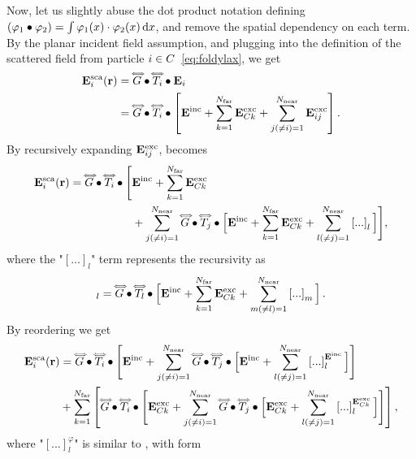 Now, let us slightly abuse the dot product notation defining $(\varphi_1 \bigcdot{x} \varphi_2) = \int \varphi_1(x)\cdot\varphi_2(x) \diff x$, and remove the spatial dependency on each term. By the planar incident field assumption, and plugging  into the definition of the scattered field from particle $i\in\Cls$~\eqref{eq:foldylax}, we get
%
\begin{align}
\label{eq:scafield_cluster1}
\ScaEField_i(\px) & = \sGreen \bigcdot{\px} \dyad{T}_i \bigcdot{\px'} \EField_i \\ & = \sGreen \bigcdot{\px'} \dyad{T}_i \bigcdot{\px''}  \left[\IncEField + \sum_{k=1}^\Nfar \ExcEField_{\Cls k}+ \sum_{j(\neq i)=1}^\Nnear \ExcEField_{ij} \right] \nonumber.
\end{align}
% 
By recursively expanding $\ExcEField_{ij}$,  becomes
\begin{align}
\label{eq:scafieldcluster3}
\ScaEField_i(\px) = \sGreen \bigcdot{\px'} \dyad{T}_i \bigcdot{\px''} \Bigg[ &\IncEField + \sum_{k=1}^\Nfar \ExcEField_{\Cls k}  \\ 
&  + \sum_{j(\neq i)=1}^\Nnear \sGreen \bigcdot{\px'''} \dyad{T}_j \bigcdot{{\px^{iv}}} \Big[\IncEField + \sum_{k=1}^\Nfar \ExcEField_{\Cls k} + \sum_{l(\neq j)=1}^\Nnear \left[...\right]_l \Big] \Bigg] \nonumber,
\end{align}
%
where the "$[...]_l$" term represents the recursivity as 
\begin{equation}
[...]_l= \sGreen \bigcdot{\px'} \dyad{T}_l \bigcdot{\px''} \Big[\IncEField + \sum_{k=1}^\Nfar \ExcEField_{\Cls k} + \sum_{m(\neq l)=1}^\Nnear \left[...\right]_m\Big] \,.
\label{eq:recursivity1}
\end{equation}
%
By reordering  we get
%
\begin{align}
\label{eq:scafieldcluster4}
\ScaEField_i(\px) &= \sGreen \bigcdot{\px'} \dyad{T}_i \bigcdot{\px''} \Bigg[ \IncEField + \sum_{j(\neq i)=1}^\Nnear \sGreen \bigcdot{\px'''} \dyad{T}_j \bigcdot{{\px^{iv}}}\Big[\IncEField + \sum_{l(\neq j)=1}^\Nnear \left[...\right]_l^{\IncEField} \Big] \Bigg] \\
& + \sum_{k=1}^\Nfar \left[\sGreen \bigcdot{\px'} \dyad{T}_i \bigcdot{\px''} \Bigg[ \ExcEField_{\Cls k} + \sum_{j(\neq i)=1}^\Nnear \sGreen \bigcdot{\px'''} \dyad{T}_j \bigcdot{{\px^{iv}}}\Big[\ExcEField_{\Cls k} + \sum_{l(\neq j)=1}^\Nnear \left[...\right]_l^{\ExcEField_{\Cls k}} \Big] \Bigg]\right], \nonumber
\end{align}
%
where "$[...]_l^\varphi$" is similar to , with form
